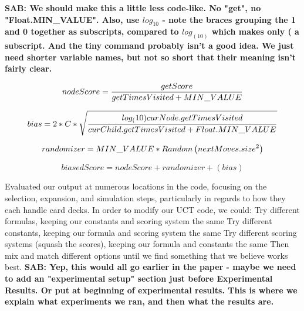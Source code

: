 \documentclass[letterpaper]{article}
\begin{document}
{\bf SAB: We should make this a little less code-like. No "get", no "Float.MIN\_VALUE". Also, use $log_{10}$ - note the braces grouping the 1 and 0 together as subscripts, compared to $log_(10)$ which makes only ( a subscript. And the tiny command probably isn't a good idea. We just need shorter variable names, but not so short that their meaning isn't fairly clear.}

\tiny
\begin{equation}
{nodeScore =  \frac{getScore}{getTimesVisited + MIN\_\\VALUE} } \label{eq:sq}
\end{equation}  
\normalsize

\tiny
\begin{equation}
{bias = 2 * C * \sqrt{\frac{log_(10) curNode.getTimesVisited}{curChild.getTimesVisited  + Float.MIN\_\\VALUE}}} \label{eq2:add}
\end{equation}  
\normalsize

\tiny
\begin{equation}
{randomizer = MIN\_\\VALUE * Random\left(nextMoves.size^2\right)}        
\end{equation}  
\normalsize

\tiny
\begin{equation}
{biasedScore = nodeScore + randomizer + (bias)}
\end{equation}  
\normalsize

Evaluated our output at numerous locations in the code, focusing on the selection, expansion, and simulation steps, particularly in regards to how they each handle card decks.
In order to modify our UCT code, we could: 
Try different formulas, keeping our constants and scoring system the same
Try different constants, keeping our formula and scoring system the same
Try different scoring systems (squash the scores), keeping our formula and constants the same
Then mix and match different options until we find something that we believe works best.
{\bf SAB: Yep, this would all go earlier in the paper - maybe we need to add an "experimental setup" section just before Experimental Results. Or put at beginning of experimental results. This is where we explain what experiments we ran, and then what the results are.}
\end{document}
